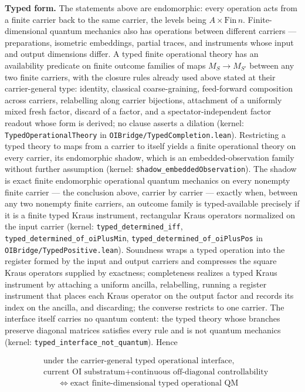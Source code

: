 \documentclass[
]{article}
\begin{document}
\textbf{Typed form.} The statements above are endomorphic: every
operation acts from a finite carrier back to the same carrier, the
levels being \(A \times \mathrm{Fin}\,n\). Finite-dimensional quantum
mechanics also has operations between different carriers ---
preparations, isometric embeddings, partial traces, and instruments
whose input and output dimensions differ. A typed finite operational
theory has an availability predicate on finite outcome families of maps
\(M_S \to M_{S'}\) between any two finite carriers, with the closure
rules already used above stated at their carrier-general type: identity,
classical coarse-graining, feed-forward composition across carriers,
relabelling along carrier bijections, attachment of a uniformly mixed
fresh factor, discard of a factor, and a spectator-independent factor
readout whose form is derived; no clause asserts a dilation (kernel:
\texttt{TypedOperationalTheory} in
\texttt{OIBridge/TypedCompletion.lean}). Restricting a typed theory to
maps from a carrier to itself yields a finite operational theory on
every carrier, its endomorphic shadow, which is an embedded-observation
family without further assumption (kernel:
\texttt{shadow\_embeddedObservation}). The shadow is exact finite
endomorphic operational quantum mechanics on every nonempty finite
carrier --- the conclusion above, carrier by carrier --- exactly when,
between any two nonempty finite carriers, an outcome family is
typed-available precisely if it is a finite typed Kraus instrument,
rectangular Kraus operators normalized on the input carrier (kernel:
\texttt{typed\_determined\_iff},
\texttt{typed\_determined\_of\_oiPlusMin},
\texttt{typed\_determined\_of\_oiPlusPos} in
\texttt{OIBridge/TypedPositive.lean}). Soundness wraps a typed operation
into the register formed by the input and output carriers and compresses
the square Kraus operators supplied by exactness; completeness realizes
a typed Kraus instrument by attaching a uniform ancilla, relabelling,
running a register instrument that places each Kraus operator on the
output factor and records its index on the ancilla, and discarding; the
converse restricts to one carrier. The interface itself carries no
quantum content: the typed theory whose branches preserve diagonal
matrices satisfies every rule and is not quantum mechanics (kernel:
\texttt{typed\_interface\_not\_quantum}). Hence

\[\boxed{\begin{aligned}&\text{under the carrier-general typed operational interface,}\\ &\text{current OI substratum} + \text{continuous off-diagonal controllability}\\ &\qquad \iff\; \text{exact finite-dimensional typed operational QM}\end{aligned}}\]
\end{document}
